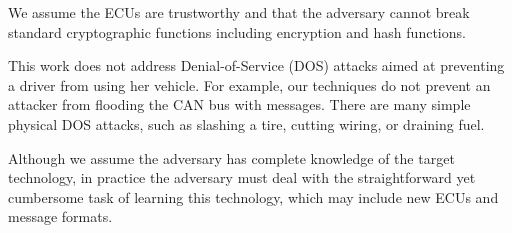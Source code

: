 We assume the ECUs are trustworthy and that the adversary cannot break standard cryptographic functions 
including encryption and hash functions.

This work does not address Denial-of-Service (DOS) attacks aimed at preventing a driver from using her vehicle.  
For example, our techniques do not prevent an attacker from flooding the CAN bus with messages.  There are many
simple physical DOS attacks, such as slashing a tire, cutting wiring, or draining fuel.

Although we assume the adversary has complete knowledge of the target technology, in practice the adversary must
deal with the straightforward yet cumbersome task of learning this technology, which may include new ECUs and message formats.


